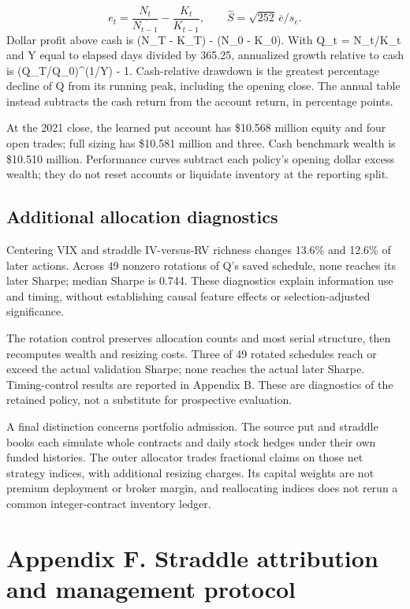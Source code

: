 \documentclass[11pt,letterpaper]{article}
\begin{document}
\[e_t=\frac{N_t}{N_{t-1}}-\frac{K_t}{K_{t-1}},\qquad\widehat S=\sqrt{252}\,\overline{e}/s_e.\]
Dollar profit above cash is (N\_T - K\_T) - (N\_0 - K\_0). With Q\_t = N\_t/K\_t and Y equal to elapsed days divided by 365.25, annualized growth relative to cash is (Q\_T/Q\_0)^(1/Y) - 1. Cash-relative drawdown is the greatest percentage decline of Q from its running peak, including the opening close. The annual table instead subtracts the cash return from the account return, in percentage points.

At the 2021 close, the learned put account has \$10.568 million equity and four open trades; full sizing has \$10.581 million and three. Cash benchmark wealth is \$10.510 million. Performance curves subtract each policy's opening dollar excess wealth; they do not reset accounts or liquidate inventory at the reporting split.

\subsection*{Additional allocation diagnostics}
Centering VIX and straddle IV-versus-RV richness changes 13.6\% and 12.6\% of later actions. Across 49 nonzero rotations of Q's saved schedule, none reaches its later Sharpe; median Sharpe is 0.744. These diagnostics explain information use and timing, without establishing causal feature effects or selection-adjusted significance.

The rotation control preserves allocation counts and most serial structure, then recomputes wealth and resizing costs. Three of 49 rotated schedules reach or exceed the actual validation Sharpe; none reaches the actual later Sharpe. Timing-control results are reported in Appendix B. These are diagnostics of the retained policy, not a substitute for prospective evaluation.

A final distinction concerns portfolio admission. The source put and straddle books each simulate whole contracts and daily stock hedges under their own funded histories. The outer allocator trades fractional claims on those net strategy indices, with additional resizing charges. Its capital weights are not premium deployment or broker margin, and reallocating indices does not rerun a common integer-contract inventory ledger.

\clearpage
\section*{Appendix F. Straddle attribution and management protocol}
\end{document}
